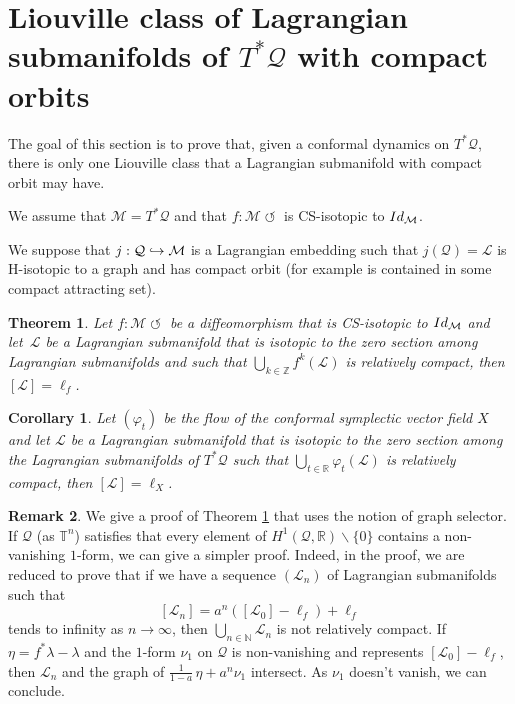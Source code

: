 \documentclass[11pt]{article}
\numberwithin{equation}{section}
\numberwithin{figure}{section}
\numberwithin{table}{section}
\def\hto{\mathrel{\lhook\joinrel\to}}
\providecommand{\righttoleftarrow}{\mathrel{\circlearrowleft}}
\newtheorem{theorem}{Theorem}
\newtheorem{corollary}{Corollary}
\theoremstyle{definition}
\newtheorem{remark}[theorem]{Remark}
\def\R{\mathbb{R}}
\def\Z{\mathbb{Z}}
\def\N{\mathbb{N}}
\def\T{\mathbb{T}}
\def\cL{{\mathcal L}}
\def\cM{{\mathcal M}}
\def\cQ{{\mathcal Q}}
\begin{document}
\section{Liouville class of Lagrangian submanifolds of \texorpdfstring{$T^*\cQ$}{T*Q} with compact orbits}

The goal of this section is to prove that, given a conformal dynamics on $T^*\cQ$, there is only one Liouville class that a Lagrangian submanifold with compact orbit may have.

We assume that $\cM=T^*\cQ$ and that $f: \cM \righttoleftarrow$ is CS-isotopic to ${\rm Id}_\cM$.

We suppose that $j:\cQ\hto\cM$ is a Lagrangian embedding such that $j(\cQ)=\cL$ is H\nobreakdash-isotopic to a graph and has compact orbit (for example is contained in some compact attracting set).

\begin{theorem}\label{Tcompactexactdiff}
Let $f: \cM \righttoleftarrow$ be a diffeomorphism that is CS-isotopic to ${\rm Id}_\cM$ and let~$\cL$ be a Lagrangian submanifold that is isotopic to the zero section among Lagrangian submanifolds and such that $\bigcup_{k\in\Z}f^k(\cL)$ is relatively compact, then $[\cL]=\ell_f$.
\end{theorem}

\begin{corollary}
Let $(\varphi_t)$ be the flow of the conformal symplectic vector field $X$ and let $\cL$ be a { Lagrangian submanifold that is isotopic to the zero section among the Lagrangian submanifolds} of $T^*\cQ$ such that $\bigcup_{t\in\R}\varphi_t(\cL)$ is relatively compact, then $[\cL]=\ell_X$.
\end{corollary}

\begin{remark}
We give a proof of Theorem \ref{Tcompactexactdiff} that uses the notion of graph selector. If $\cQ$ (as $\T^n$) satisfies that every element of $H^1(\cQ, \R)\backslash\{ 0\}$ contains a non-vanishing $1$\nobreakdash-form, we can give a simpler proof. Indeed, in the proof, we are reduced to prove that if we have a sequence $(\cL_n)$ of Lagrangian submanifolds such that
\[
[ \cL_n]=a^n([\cL_0]-\ell_f)+\ell_f
\]
tends to infinity as $n \to \infty$, then $\bigcup_{n\in\N}\cL_n$ is not relatively compact. If $\eta=f^*\lambda-\lambda$ and the $1$-form $\nu_1$ on $\cQ$ is non-vanishing and represents $[\cL_0]-\ell_f$, then $\cL_n$ and the graph of $\frac{1}{1-a}\,\eta+a^n\nu_1$ intersect. As $\nu_1$ doesn't vanish, we can conclude.
\end{remark}
\end{document}
